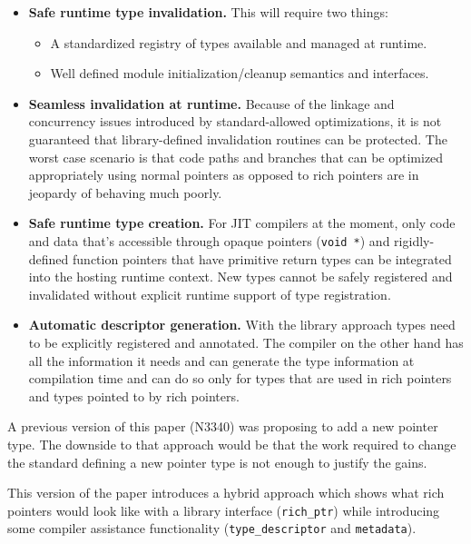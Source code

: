 \begin{itemize}

  \item \textbf{Safe runtime type invalidation.} This will require two things:

  \begin{itemize}

   \item A standardized registry of types available and managed at runtime.

   \item Well defined module initialization/cleanup semantics and interfaces.

  \end{itemize}

  \item \textbf{Seamless invalidation at runtime.} Because of the linkage and
  concurrency issues introduced by standard-allowed optimizations, it is not
  guaranteed that library-defined invalidation routines can be protected. The
  worst case scenario is that code paths and branches that can be optimized
  appropriately using normal pointers as opposed to rich pointers are in
  jeopardy of behaving much poorly.

  \item \textbf{Safe runtime type creation.} For JIT compilers at the moment,
  only code and data that’s accessible through opaque pointers (\verb+void *+)
  and rigidly-defined function pointers that have primitive return types can
  be integrated into the hosting runtime context. New types cannot be safely
  registered and invalidated without explicit runtime support of type
  registration.

  \item \textbf{Automatic descriptor generation.} With the library approach
  types need to be explicitly registered and annotated. The compiler on the
  other hand has all the information it needs and can generate the type
  information at compilation time and can do so only for types that are used
  in rich pointers and types pointed to by rich pointers.

\end{itemize}

A previous version of this paper (N3340) was proposing to add a new pointer type. The downside to that approach would be that the work required to change the standard defining a new pointer type is not enough to justify the gains.

This version of the paper introduces a hybrid approach which shows what rich pointers would look like with a library interface (\verb+rich_ptr+) while introducing some compiler assistance functionality (\verb+type_descriptor+ and \verb+metadata+).

